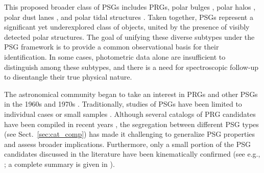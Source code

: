 \documentclass{aa}
\begin{document}
This proposed broader class of PSGs includes PRGs, polar bulges \citep[][]{2012MNRAS.423L..79C,2015AstL...41..748R}, polar halos \citep[][]{2020MNRAS.494.1751M,2022RAA....22k5003M,2022MNRAS.512.2556H}, polar dust lanes \citep[which often correspond to gaseous polar rings;][]{1978ApJ...226L.115B,2009MNRAS.393..317S}, and polar tidal structures \citep{2008ApJ...689..184M,2023A&A...671A.141M}. Taken together, PSGs represent a significant yet underexplored class of objects, united by the presence of visibly detected polar structures. The goal of unifying these diverse subtypes under the PSG framework is to provide a common observational basis for their identification. In some cases, photometric data alone are insufficient to distinguish among these subtypes, and there is a need for spectroscopic follow-up to disentangle their true physical nature.

The astronomical community began to take an interest in PRGs and other PSGs in the 1960s and 1970s \citep{1961hag..book.....S, 1978ApJ...226L.115B, 1978AJ.....83.1360S, 1983AJ.....88..909S}. Traditionally, studies of PSGs have been limited to individual cases \citep{1978AJ.....83.1360S, 1995AJ....109..942V, 2006A&A...451...99B, 2013A&A...560A..14P, 2015MNRAS.450..998S, 2020MNRAS.491.1887Q, 2022PASP..134i4105N} or small samples \citep{2012AstBu..67..147M, 2012MNRAS.422.2386F, 2013AstBu..68..371S, 2019MNRAS.486.4186E, 2022RAA....22k5003M}. Although several catalogs of PRG candidates have been compiled in recent years \citep{1990AJ....100.1489W, 2011MNRAS.418..244M, 2019MNRAS.483.1470R}, the segregation between different PSG types (see Sect.~\ref{sec:cat_comp}) has made it challenging to generalize PSG properties and assess broader implications. Furthermore, only a small portion of the PSG candidates discussed in the literature have been kinematically confirmed (see e.g., \citealt{1983AJ.....88..909S,1990AJ....100.1489W, 2011MNRAS.418..244M, 2014ASPC..486...61M}; a complete summary is given in \citealt{2026ApJ...999..199Y}).
\end{document}
